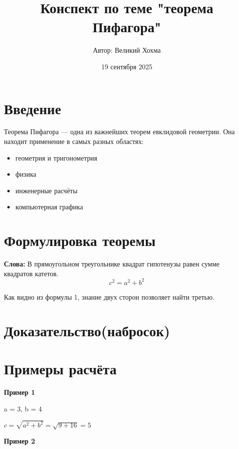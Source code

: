 \documentclass{article}
\title{Конспект по теме "теорема Пифагора"}
\author{Автор: Великий Хохма}
\date{19 сентября 2025}
\begin{document}
\maketitle


\tableofcontents
\newpage
\section{Введение}
Теорема Пифагора — одна из важнейших теорем евклидовой геометрии. Она находит
применение в самых разных областях:
\begin{itemize}
    \item геометрия и тригонометрия
    \item физика
    \item инженерные расчёты
    \item компьютерная графика
\end{itemize}

\section{Формулировка теоремы}
\textbf{Слова:}
В прямоугольном треугольнике квадрат гипотенузы равен сумме квадратов
катетов.
\begin{equation}\label{eq:pythago}
c^2 = a^2 + b^2
\end{equation}
\begin{center}

  \text Как видно из формулы 1, знание двух сторон позволяет найти третью.
\end{center}

\section{Доказательство(набросок)}
\begin{center}
\end{center}

\section{Примеры расчёта}
\textbf{Пример 1}
\begin{center}

  \text a = 3, b = 4


  \text $ c = \sqrt{a^2 + b^2} = \sqrt{9 + 16} = 5$
\end{center}
\textbf{Пример 2}
\end{document}
